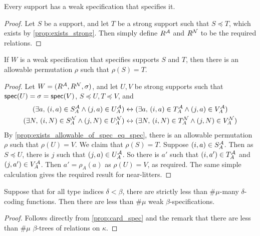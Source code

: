 \begin{proposition}
  \label{prop:exists_weakSpec}
  Every support has a weak specification that specifies it.
\end{proposition}
\begin{proof}
  Let \( S \) be a support, and let \( T \) be a strong support such that \( S \preceq T \), which exists by \cref{prop:exists_strong}.
  Then simply define \( R^{\mathcal A} \) and \( R^{\mathcal N} \) to be the required relations.
\end{proof}
\begin{proposition}
  \label{prop:exists_allowable_of_weakSpec}
  If \( W \) is a weak specification that specifies supports \( S \) and \( T \), then there is an allowable permutation \( \rho \) such that \( \rho(S) = T \).
\end{proposition}
\begin{proof}
  Let \( W = (R^{\mathcal A}, R^{\mathcal N}, \sigma) \), and let \( U, V \) be strong supports such that \( \operatorname{\mathsf{spec}}(U) = \sigma = \operatorname{\mathsf{spec}}(V) \), \( S \preceq U, T \preceq V \), and
  \begin{align*}
    (\exists a,\, (i, a) \in S_A^{\mathcal A} \wedge (j, a) \in U_A^{\mathcal A}) &\leftrightarrow (\exists a,\, (i, a) \in T_A^{\mathcal A} \wedge (j, a) \in V_A^{\mathcal A}) \\
    (\exists N,\, (i, N) \in S_A^{\mathcal N} \wedge (j, N) \in U_A^{\mathcal N}) &\leftrightarrow (\exists N,\, (i, N) \in T_A^{\mathcal N} \wedge (j, N) \in V_A^{\mathcal N})
  \end{align*}
  By \cref{prop:exists_allowable_of_spec_eq_spec}, there is an allowable permutation \( \rho \) such that \( \rho(U) = V \).
  We claim that \( \rho(S) = T \).
  Suppose \( (i, a) \in S_A^{\mathcal A} \).
  Then as \( S \preceq U \), there is \( j \) such that \( (j, a) \in U_A^{\mathcal A} \).
  So there is \( a' \) such that \( (i, a') \in T_A^{\mathcal A} \) and \( (j, a') \in V_A^{\mathcal A} \).
  Then \( a' = \rho_A(a) \) as \( \rho(U) = V \), as required.
  The same simple calculation gives the required result for near-litters.
\end{proof}
\begin{proposition}
  \label{prop:card_weakSpec}
  Suppose that for all type indices \( \delta < \beta \), there are strictly less than \( \#\mu \)-many \( \delta \)-coding functions.
  Then there are less than \( \#\mu \) weak \( \beta \)-specifications.
\end{proposition}
\begin{proof}
  Follows directly from \cref{prop:card_spec} and the remark that there are less than \( \#\mu \) \( \beta \)-trees of relations on \( \kappa \).
\end{proof}
